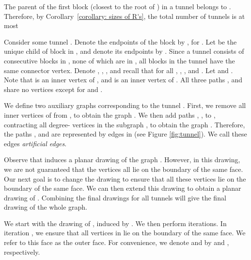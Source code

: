 \documentclass[twoside,leqno,twocolumn]{article}
\begin{document}
The parent of the first block (closest to the root of ) in a tunnel 
belongs to . 
Therefore, by Corollary~\ref{corollary: sizes of R's}, the total number of tunnels is at most


Consider some tunnel . Denote the endpoints of the block  by , for .
Let  be the unique child of block  in , and denote its endpoints by . Since a tunnel consists of consecutive blocks in , none of which
are in , all blocks in the tunnel have the same connector vertex.
Denote , , , and recall that for all , , , and . Let
 and .
Note that  is an inner vertex of , and  is an inner vertex of .
All three paths ,  and  share no vertices except for  and .

We define two auxiliary graphs corresponding to the tunnel . First, we remove all inner vertices of  from , to obtain the graph . 
We then add paths , ,  to , contracting all degree- vertices
in the subgraph , to obtain the graph .
Therefore, the paths ,  and  are represented by  edges in  (see Figure \ref{fig:tunnel}).
We call these edges \textit{artificial edges}. 



Observe that  induces a planar drawing  of the graph . However, in this drawing, we are not guaranteed that the vertices  all lie on the boundary of the same face. Our next goal is to change the drawing  to ensure that all these vertices lie on the boundary of the same face. We can then extend this drawing to obtain a planar drawing of . Combining the final drawings  for all tunnels  will give the final drawing  of the whole graph.

We start with the drawing  of , induced by . We then perform  iterations. In iteration , we ensure that  all vertices in  lie on the boundary of the same face. We refer to this face as the outer face. For convenience, we denote  and  by  and , respectively.
\end{document}
